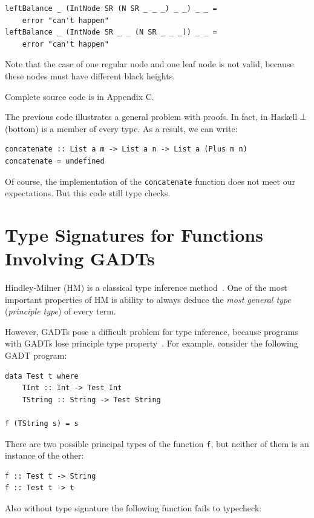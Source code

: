 \documentclass{tmr}
\newcommand{\italic}[1]{\textit{#1}}
\begin{document}
\begin{Verbatim}
leftBalance _ (IntNode SR (N SR _ _ _) _ _) _ _ =
    error "can't happen"
leftBalance _ (IntNode SR _ _ (N SR _ _ _)) _ _ =
    error "can't happen"
\end{Verbatim}

Note that the case of one regular node and one leaf node is not valid, because these nodes must have different black heights.

Complete source code is in Appendix C.

The previous code illustrates a general problem with proofs. In fact, in Haskell $\bot$ (bottom) is a member of every type. As a result, we can write:

\begin{Verbatim}
concatenate :: List a m -> List a n -> List a (Plus m n)
concatenate = undefined
\end{Verbatim}

Of course, the implementation of the \verb|concatenate| function does not meet our expectations. But this code still type checks.

\section{Type Signatures for Functions Involving GADTs}
\label{sec:type_signatures}

Hindley-Milner (HM) is a classical type inference method~\cite{cardelli_typechecking}. One of the most important properties of HM is ability to always deduce the \italic{most general type} (\italic{principle type}) of every term.

However, GADTs pose a difficult problem for type inference, because programs with GADTs lose principle type property~\cite{type_inference_gadts}. For example, consider the following GADT program:

\begin{Verbatim}
data Test t where
    TInt :: Int -> Test Int
    TString :: String -> Test String

f (TString s) = s
\end{Verbatim}

There are two possible principal types of the function \verb|f|, but neither of them is an instance of the other:

\begin{Verbatim}
f :: Test t -> String
f :: Test t -> t
\end{Verbatim}

Also without type signature the following function fails to typecheck:
\end{document}
